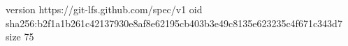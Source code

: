 version https://git-lfs.github.com/spec/v1
oid sha256:b2f1a1b261c42137930e8af8e62195cb403b3e49c8135e623235c4f671c343d7
size 75
